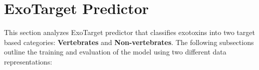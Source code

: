 



\pagebreak

\section{ExoTarget Predictor}
This section analyzes ExoTarget predictor that classifies exotoxins into two target based categories: \textbf{Vertebrates} and \textbf{Non-vertebrates}. The following subsections outline the training and evaluation of the model using two different data representations:

